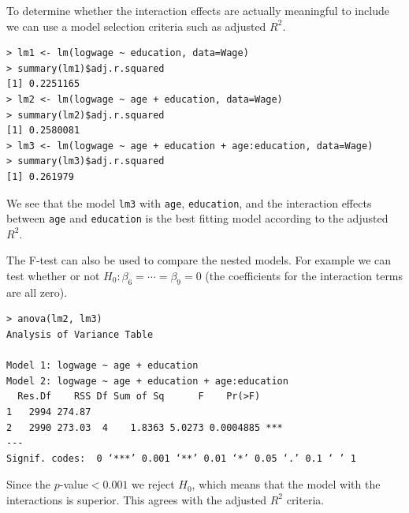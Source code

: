 \documentclass[10pt]{beamer}\usepackage[]{graphicx}\usepackage[]{color}
\begin{document}
\begin{frame}[fragile]
To determine whether the interaction effects are actually meaningful to include we can use a model selection criteria such as adjusted $R^2$.

\small
\begin{verbatim}
> lm1 <- lm(logwage ~ education, data=Wage)
> summary(lm1)$adj.r.squared
[1] 0.2251165
> lm2 <- lm(logwage ~ age + education, data=Wage)
> summary(lm2)$adj.r.squared
[1] 0.2580081
> lm3 <- lm(logwage ~ age + education + age:education, data=Wage)
> summary(lm3)$adj.r.squared
[1] 0.261979
\end{verbatim}
We see that the model \texttt{lm3} with \texttt{age}, \texttt{education}, and the interaction effects between \texttt{age} and \texttt{education} is the best fitting model according to the adjusted $R^2$.
\end{frame}

\begin{frame}[fragile]
The F-test can also be used to compare the nested models.  For example we can test whether or not $H_0: \beta_6 = \cdots = \beta_9 = 0$ (the coefficients for the interaction terms are all zero).
\begin{verbatim}
> anova(lm2, lm3)
Analysis of Variance Table

Model 1: logwage ~ age + education
Model 2: logwage ~ age + education + age:education
  Res.Df    RSS Df Sum of Sq      F    Pr(>F)    
1   2994 274.87                                  
2   2990 273.03  4    1.8363 5.0273 0.0004885 ***
---
Signif. codes:  0 ‘***’ 0.001 ‘**’ 0.01 ‘*’ 0.05 ‘.’ 0.1 ‘ ’ 1
\end{verbatim}
Since the $p$-value$< 0.001$ we reject $H_0$, which means that the model with the interactions is superior.  This agrees with the adjusted $R^2$ criteria.
\end{frame}
\end{document}
